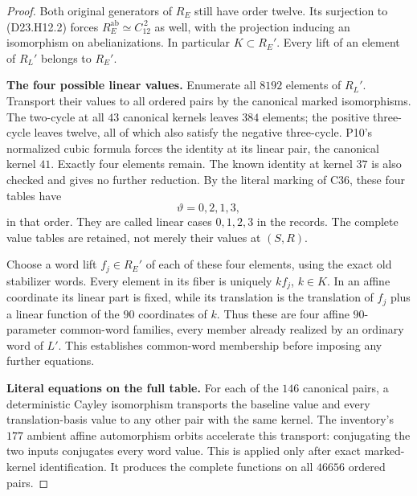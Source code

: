 \begin{proof}
Both original generators of $R_E$ still have order twelve.
Its surjection to (D23.H12.2) forces
$R_E^{\mathrm{ab}}\simeq C_{12}^{\,2}$ as well, with the
projection inducing an isomorphism on abelianizations.
In particular $K\subset R_E'$. Every lift of an element
of $R_L'$ belongs to $R_E'$.

\textbf{The four possible linear values.}\quad
Enumerate all $8192$ elements of $R_L'$. Transport their
values to all ordered pairs by the canonical marked
isomorphisms. The two-cycle at all $43$ canonical kernels
leaves $384$ elements; the positive three-cycle leaves
twelve, all of which also satisfy the negative three-cycle.
P10's normalized cubic formula forces the identity at its
linear pair, the canonical kernel $41$. Exactly four
elements remain. The known identity at kernel $37$ is
also checked and gives no further reduction.
By the literal marking of C36, these four tables have
\[
                         \vartheta=0,2,1,3,
                                                        \tag{D23.H12.4}
\]
in that order. They are called linear cases $0,1,2,3$
in the records. The complete value tables are retained,
not merely their values at $(S,R)$.

Choose a word lift $f_j\in R_E'$ of each of these four
elements, using the exact old stabilizer words. Every
element in its fiber is uniquely $k f_j$, $k\in K$.
In an affine coordinate its linear part is fixed, while
its translation is the translation of $f_j$ plus a linear
function of the $90$ coordinates of $k$. Thus these are
four affine $90$-parameter common-word families, every
member already realized by an ordinary word of $L'$.
This establishes common-word membership before imposing
any further equations.

\textbf{Literal equations on the full table.}\quad
For each of the $146$ canonical pairs, a deterministic
Cayley isomorphism transports the baseline value and every
translation-basis value to any other pair with the same
kernel. The inventory's $177$ ambient affine automorphism
orbits accelerate this transport: conjugating the two
inputs conjugates every word value. This is applied only
after exact marked-kernel identification. It produces
the complete functions on all $46656$ ordered pairs.


\end{proof}
